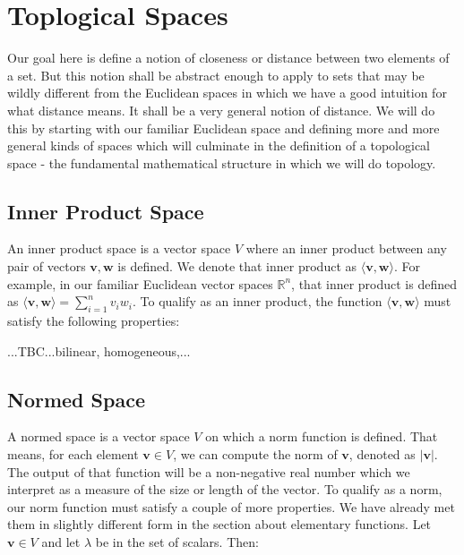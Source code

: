 \section{Toplogical Spaces}
Our goal here is define a notion of closeness or distance between two elements of a set. But this notion shall be abstract enough to apply to sets that may be wildly different from the Euclidean spaces in which we have a good intuition for what distance means. It shall be a very general notion of distance. We will do this by starting with our familiar Euclidean space and defining more and more general kinds of spaces which will culminate in the definition of a topological space - the fundamental mathematical structure in which we will do topology.

\subsection{Inner Product Space}
An inner product space is a vector space $V$ where an inner product between any pair of vectors $\mathbf{v,w}$ is defined. We denote that inner product as $\langle \mathbf{v,w} \rangle$. For example, in our familiar Euclidean vector spaces $\mathbb{R}^n$, that inner product is defined as $\langle \mathbf{v,w} \rangle = \sum_{i=1}^n v_i w_i$. To qualify as an inner product, the function $\langle \mathbf{v,w} \rangle$ must satisfy the following properties:




...TBC...bilinear, homogeneous,...






\subsection{Normed Space}
A normed space is a vector space $V$ on which a norm function is defined. That means, for each element $\mathbf{v} \in V$, we can compute the norm of $\mathbf{v}$, denoted as $|\mathbf{v}|$. The output of that function will be a non-negative real number which we interpret as a measure of the size or length of the vector. To qualify as a norm, our norm function must satisfy a couple of more properties. We have already met them in slightly different form in the section about elementary functions. Let $\mathbf{v} \in V$ and let $\lambda$ be in the set of scalars. Then:

